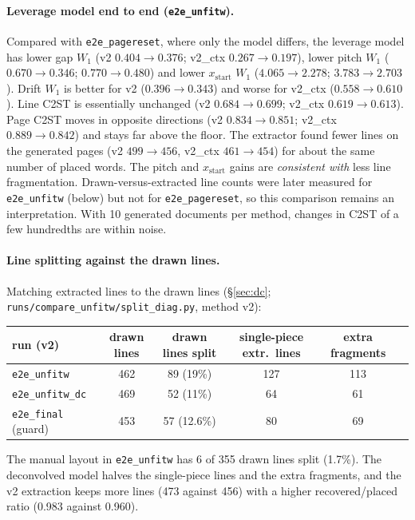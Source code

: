 \documentclass[11pt,a4paper]{article}
\newcommand{\src}[1]{{\footnotesize\texttt{#1}}}
\begin{document}
\paragraph{Leverage model end to end (\texttt{e2e\_unfitw}).} Compared with
\texttt{e2e\_pagereset}, where only the model differs, the leverage model has
lower gap $W_1$ (v2 $0.404\to0.376$; v2\_ctx $0.267\to0.197$), lower pitch
$W_1$ ($0.670\to0.346$; $0.770\to0.480$) and lower $x_\text{start}$ $W_1$
($4.065\to2.278$; $3.783\to2.703$). Drift $W_1$ is better for v2
($0.396\to0.343$) and worse for v2\_ctx ($0.558\to0.610$). Line C2ST is
essentially unchanged (v2 $0.684\to0.699$; v2\_ctx $0.619\to0.613$). Page
C2ST moves in opposite directions (v2 $0.834\to0.851$; v2\_ctx
$0.889\to0.842$) and stays far above the floor. The extractor found fewer lines
on the generated pages (v2 $499\to456$, v2\_ctx $461\to454$) for about the
same number of placed words. The pitch and $x_\text{start}$ gains are
\emph{consistent with} less line fragmentation. Drawn-versus-extracted line
counts were later measured for \texttt{e2e\_unfitw} (below) but not for
\texttt{e2e\_pagereset}, so this comparison remains an interpretation.
With 10 generated documents per method, changes in C2ST of a few hundredths
are within noise.

\paragraph{Line splitting against the drawn lines.} Matching extracted lines
to the drawn lines (\S\ref{sec:dc}; \src{runs/compare\_unfitw/split\_diag.py},
method v2):
\begin{center}\small
\begin{tabular}{lccccc}
\toprule
run (v2) & drawn lines & drawn lines split & single-piece extr.\ lines & extra fragments\\
\midrule
\texttt{e2e\_unfitw} & 462 & 89 (19\%) & 127 & 113\\
\texttt{e2e\_unfitw\_dc} & 469 & 52 (11\%) & 64 & 61\\
\texttt{e2e\_final} (guard) & 453 & 57 (12.6\%) & 80 & 69\\
\bottomrule
\end{tabular}
\end{center}
The manual layout in \texttt{e2e\_unfitw} has 6 of 355 drawn lines split
(1.7\%). The deconvolved model halves the single-piece lines and the extra
fragments, and the v2 extraction keeps more lines (473 against 456) with a
higher recovered/placed ratio (0.983 against 0.960).
\end{document}
